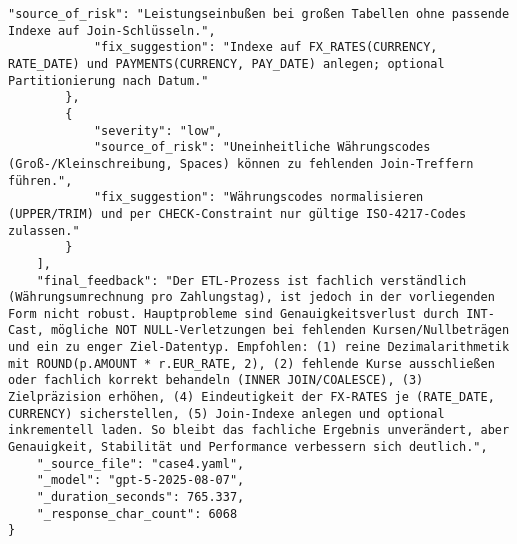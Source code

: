 \begin{lstlisting}[caption={Ausgabe: GPT-5 Anwendungsfall 4 Robustheitsdurchlauf},label={gpt_case4_prompt3}]
            "source_of_risk": "Leistungseinbußen bei großen Tabellen ohne passende Indexe auf Join-Schlüsseln.",
            "fix_suggestion": "Indexe auf FX_RATES(CURRENCY, RATE_DATE) und PAYMENTS(CURRENCY, PAY_DATE) anlegen; optional Partitionierung nach Datum."
        },
        {
            "severity": "low",
            "source_of_risk": "Uneinheitliche Währungscodes (Groß-/Kleinschreibung, Spaces) können zu fehlenden Join-Treffern führen.",
            "fix_suggestion": "Währungscodes normalisieren (UPPER/TRIM) und per CHECK-Constraint nur gültige ISO-4217-Codes zulassen."
        }
    ],
    "final_feedback": "Der ETL-Prozess ist fachlich verständlich (Währungsumrechnung pro Zahlungstag), ist jedoch in der vorliegenden Form nicht robust. Hauptprobleme sind Genauigkeitsverlust durch INT-Cast, mögliche NOT NULL-Verletzungen bei fehlenden Kursen/Nullbeträgen und ein zu enger Ziel-Datentyp. Empfohlen: (1) reine Dezimalarithmetik mit ROUND(p.AMOUNT * r.EUR_RATE, 2), (2) fehlende Kurse ausschließen oder fachlich korrekt behandeln (INNER JOIN/COALESCE), (3) Zielpräzision erhöhen, (4) Eindeutigkeit der FX-RATES je (RATE_DATE, CURRENCY) sicherstellen, (5) Join-Indexe anlegen und optional inkrementell laden. So bleibt das fachliche Ergebnis unverändert, aber Genauigkeit, Stabilität und Performance verbessern sich deutlich.",
    "_source_file": "case4.yaml",
    "_model": "gpt-5-2025-08-07",
    "_duration_seconds": 765.337,
    "_response_char_count": 6068
}
\end{lstlisting}

